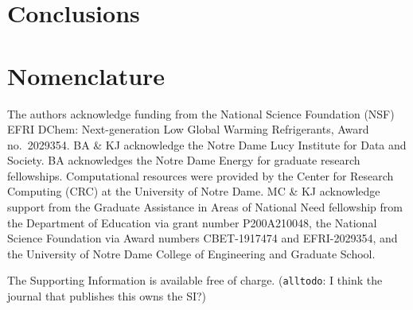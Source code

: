 \documentclass[journal=jacsat,manuscript=article]{achemso}
\newcommand{\alltodo}[1]{{\color{Cyan} (\texttt{alltodo}: #1)}}
\begin{document}
\section{Conclusions}


\section{Nomenclature}

\begin{acknowledgement}
The authors acknowledge funding from the National Science Foundation (NSF) EFRI DChem: Next-generation Low Global Warming Refrigerants, Award no.~2029354. BA \& KJ acknowledge the Notre Dame Lucy Institute for Data and Society. BA acknowledges the Notre Dame Energy for graduate research fellowships. Computational resources were provided by the Center for Research Computing (CRC) at the University of Notre Dame. MC \& KJ acknowledge support from the Graduate Assistance in Areas of National Need fellowship from the Department of Education via grant number P200A210048, the National Science Foundation via Award numbers CBET-1917474 and EFRI-2029354, and the University of Notre Dame College of Engineering and Graduate School.  
\end{acknowledgement}

\begin{suppinfo}
The Supporting Information is available free of charge. \alltodo{I think the journal that publishes this owns the SI?}

\end{suppinfo}



\end{document}

